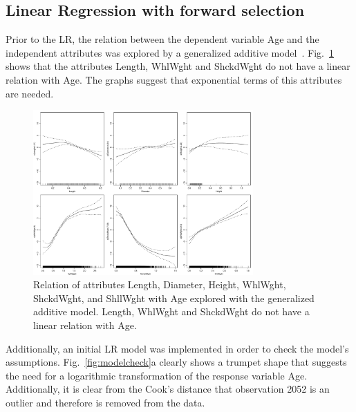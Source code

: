 \documentclass[10pt, paper=a4]{article}
\begin{document}
\subsection{Linear Regression with forward selection}
Prior to the LR, the relation between the dependent variable Age and
the independent attributes was explored by a generalized additive
model~\cite{gam}.  Fig.~\ref{fig:gam} shows that the attributes
Length, WhlWght and ShckdWght do not have a linear relation with Age.
The graphs suggest that exponential terms of this attributes are
needed.

\begin{figure}[h]
  \centering
  \includegraphics[width = 0.75\textwidth]{gam.pdf}
  \caption{Relation of attributes Length, Diameter, Height, WhlWght,
    ShckdWght, and ShllWght with Age explored with the generalized
    additive model.  Length, WhlWght and ShckdWght do not have a
    linear relation with Age.}
  \label{fig:gam}
\end{figure}

Additionally, an initial LR model was implemented in order to check
the model's assumptions.  Fig.~\ref{fig:modelcheck}a clearly shows a
trumpet shape that suggests the need for a logarithmic transformation
of the response variable Age.  Additionally, it is clear from the
Cook's distance that observation 2052 is an outlier and therefore is
removed from the data.
\end{document}
